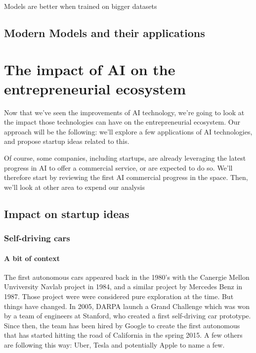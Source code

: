 \documentclass[12pt]{article}
\begin{document}
Models are better when trained on bigger datasets

\subsection{Modern Models and their applications}
\pagebreak



\section{The impact of AI on the entrepreneurial ecosystem}

Now that we've seen the improvements of AI technology, we're going to look at
the impact those technologies can have on the entrepreneurial ecosystem.
Our approach will be the following: we'll explore a few applications of AI
technologies, and propose startup ideas related to this.

Of course, some companies, including startups, are already leveraging the latest
 progress in AI to offer a commercial service, or are expected to do so.
 We'll therefore start by reviewing the first AI commercial progress in the
 space. Then, we'll look at other area to expend our analysis

\subsection{Impact on startup ideas}

\subsubsection{Self-driving cars}

\paragraph{A bit of context}

The first autonomous cars appeared back in the 1980's with the Canergie Mellon
Unviversity Navlab project in 1984, and a similar project by Mercedes Benz in
1987. Those project were were considered pure exploration at the time.
But things have changed. In 2005, DARPA launch a Grand Challenge which was won
by a team of engineers at Stanford, who created a first self-driving car
prototype. Since then, the team has been hired by Google to create the first
autonomous that has started hitting the road of California in the spring 2015.
A few others are following this way: Uber, Tesla and potentially Apple to name
a few.
\end{document}
